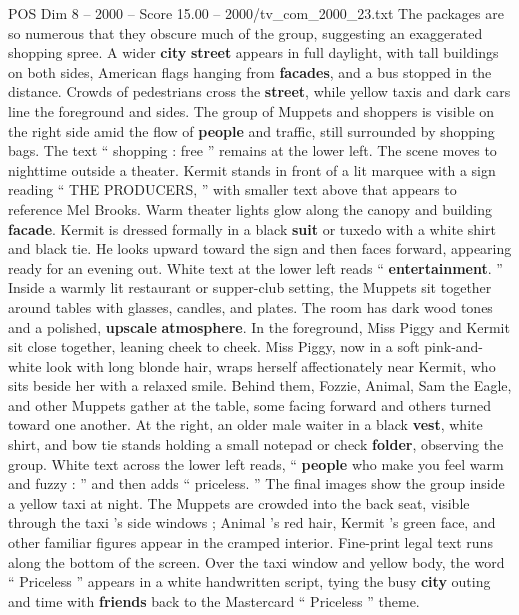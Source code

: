 \begin{textsample}{POS Dim 8 – 2000 – Score 15.00 – 2000/tv\_com\_2000\_23.txt}
The packages are so numerous that they obscure much of the group, suggesting an exaggerated shopping spree.
A wider \textbf{city} \textbf{street} appears in full daylight, with tall buildings on both sides, American flags hanging from \textbf{facades}, and a bus stopped in the distance.
Crowds of pedestrians cross the \textbf{street}, while yellow taxis and dark cars line the foreground and sides.
The group of Muppets and shoppers is visible on the right side amid the flow of \textbf{people} and traffic, still surrounded by shopping bags.
The text “ shopping : free ” remains at the lower left.
The scene moves to nighttime outside a theater.
Kermit stands in front of a lit marquee with a sign reading “ THE PRODUCERS, ” with smaller text above that appears to reference Mel Brooks.
Warm theater lights glow along the canopy and building \textbf{facade}.
Kermit is dressed formally in a black \textbf{suit} or tuxedo with a white shirt and black tie.
He looks upward toward the sign and then faces forward, appearing ready for an evening out.
White text at the lower left reads “ \textbf{entertainment}. ” Inside a warmly lit restaurant or supper-club setting, the Muppets sit together around tables with glasses, candles, and plates.
The room has dark wood tones and a polished, \textbf{upscale} \textbf{atmosphere}.
In the foreground, Miss Piggy and Kermit sit close together, leaning cheek to cheek.
Miss Piggy, now in a soft pink-and-white look with long blonde hair, wraps herself affectionately near Kermit, who sits beside her with a relaxed smile.
Behind them, Fozzie, Animal, Sam the Eagle, and other Muppets gather at the table, some facing forward and others turned toward one another.
At the right, an older male waiter in a black \textbf{vest}, white shirt, and bow tie stands holding a small notepad or check \textbf{folder}, observing the group.
White text across the lower left reads, “ \textbf{people} who make you feel warm and fuzzy : ” and then adds “ priceless. ” The final images show the group inside a yellow taxi at night.
The Muppets are crowded into the back seat, visible through the taxi ’s side windows ; Animal ’s red hair, Kermit ’s green face, and other familiar figures appear in the cramped interior.
Fine-print legal text runs along the bottom of the screen.
Over the taxi window and yellow body, the word “ Priceless ” appears in a white handwritten script, tying the busy \textbf{city} outing and time with \textbf{friends} back to the Mastercard “ Priceless ” theme.

\end{textsample}
